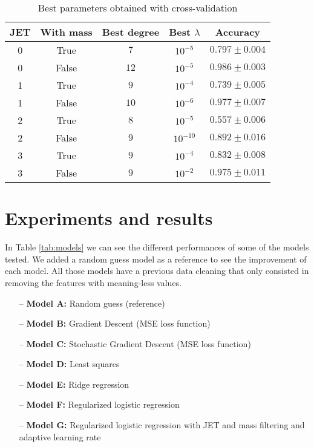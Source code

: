 \documentclass[10pt,conference,compsocconf]{IEEEtran}
\begin{document}
\begin{table}[htbp]
  \centering
  \begin{tabular}[c]{|c|c|c|c|c|}
    \hline
    JET & With mass & Best degree & Best $\lambda$ & Accuracy\\
    \hline
    0 & True & $7$ & $10^{-5}$ & $0.797 \pm 0.004$\\
    0 & False & $12$ & $10^{-5}$ & $0.986 \pm 0.003$\\
    1 & True & $9$ & $10^{-4}$ & $0.739 \pm 0.005$ \\
    1 & False & $10$ & $10^{-6}$ & $0.977 \pm 0.007$ \\
    2 & True & $8$ & $10^{-5}$ & $0.557 \pm 0.006$ \\
    2 & False & $9$ & $10^{-10}$ & $0.892 \pm 0.016$ \\
    3 & True & $9$ & $10^{-4}$ & $0.832 \pm 0.008$ \\
    3 & False & $9$ & $10^{-2}$ & $0.975 \pm 0.011$ \\
    \hline
  \end{tabular}
  \caption{Best parameters obtained with cross-validation}
  \label{tab:cv}
\end{table}


\section{Experiments and results}
\label{sec:results}

In Table \ref{tab:models} we can see the different performances of some of the models tested. We added a random guess model as a reference to see the improvement of each model. All those models have a previous data cleaning that only consisted in removing the features with meaning-less values.

\begin{itemize}
    \item[--] \textbf{Model A:} Random guess (reference)
    \item[--] \textbf{Model B:} Gradient Descent (MSE loss function)
    \item[--] \textbf{Model C:} Stochastic Gradient Descent (MSE loss function)
    \item[--] \textbf{Model D:} Least squares
    \item[--] \textbf{Model E:} Ridge regression
    \item[--] \textbf{Model F:} Regularized logistic regression
    \item[--] \textbf{Model G:} Regularized logistic regression with JET and mass filtering and adaptive learning rate
\end{itemize}
\end{document}
